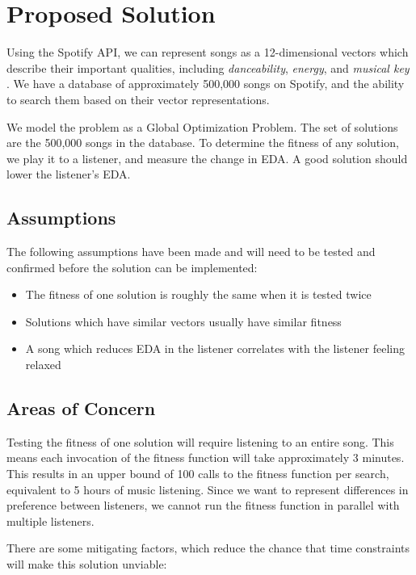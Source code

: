 \documentclass{article}
\begin{document}
	\section{Proposed Solution}
	Using the Spotify API, we can represent songs as a 12-dimensional vectors which describe their important qualities, including \emph{danceability}, \emph{energy}, and \emph{musical key} \cite{spotify_get_nodate, jehan_analyzer_nodate}. We have a database of approximately 500,000 songs on Spotify, and the ability to search them based on their vector representations.
	
	We model the problem as a Global Optimization Problem. The set of solutions are the 500,000 songs in the database. To determine the fitness of any solution, we play it to a listener, and measure the change in EDA. A good solution should lower the listener's EDA.
	
	\subsection{Assumptions}
	The following assumptions have been made and will need to be tested and confirmed before the solution can be implemented:
	
	\begin{itemize}
		\item The fitness of one solution is roughly the same when it is tested twice
		\item Solutions which have similar vectors usually have similar fitness
		\item A song which reduces EDA in the listener correlates with the listener feeling relaxed
	\end{itemize}

	\subsection{Areas of Concern}
	Testing the fitness of one solution will require listening to an entire song. This means each invocation of the fitness function will take approximately 3 minutes. This results in an upper bound of 100 calls to  the fitness function per search, equivalent to 5 hours of music listening. Since we want to represent differences in preference between listeners, we cannot run the fitness function in parallel with multiple listeners.

	There are some mitigating factors, which reduce the chance that time constraints will make this solution unviable:
	
\end{document}
